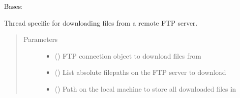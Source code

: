 \documentclass[letterpaper,10pt,english]{sphinxmanual}
\begin{document}
\begin{fulllineitems}
\label{\detokenize{polo.threads:polo.threads.thread.FTPDownloadThread}}
Bases: {\hyperref[\detokenize{polo.threads:polo.threads.thread.thread}]{}}

Thread specific for downloading files from a remote FTP server.
\begin{quote}\begin{description}
\item[{Parameters}] \leavevmode\begin{itemize}
\item {} 
 () \textendash{} FTP connection object to download files from

\item {} 
 () \textendash{} List absolute filepaths on the FTP server to download

\item {} 
 () \textendash{} Path on the local machine to store all downloaded files in

\end{itemize}

\end{description}\end{quote}

\begin{fulllineitems}
\label{\detokenize{polo.threads:polo.threads.thread.FTPDownloadThread.download_path}}
\end{fulllineitems}



\end{fulllineitems}
\end{document}
